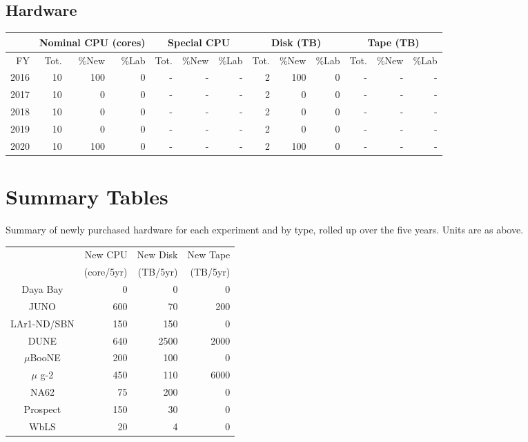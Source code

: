 \documentclass[pdftex,12pt,letter]{article}
\begin{document}
\subsection{Hardware}

\begin{tabular}[h]{|r || r|r|r || r|r|r || r|r|r || r|r|r ||}
  \hline
   & \multicolumn{3}{c||}{Nominal CPU (cores)} & \multicolumn{3}{c||}{Special CPU} & \multicolumn{3}{c||}{Disk (TB)} & \multicolumn{3}{c||}{Tape (TB)} \\
   \hline
  FY & Tot. & \%New & \%Lab & Tot. & \%New & \%Lab & Tot. & \%New & \%Lab & Tot. & \%New & \%Lab \\
  \hline
  2016 & 10 & 100& 0&- &- &- & 2& 100 & 0&- &- &- \\
  \hline
  2017 & 10&    0& 0&- &- &- & 2& 0& 0&- &- &-  \\
  \hline
  2018 & 10&    0& 0&- &- &- & 2& 0& 0&- &- &-  \\
  \hline
  2019 & 10&    0& 0&- &- &- & 2& 0& 0&- &- &-  \\
  \hline
  2020 & 10&  100& 0&- &- &- & 2& 100& 0&- &- &-  \\
  \hline
\end{tabular}

%

\pagebreak
\section{Summary Tables}

Summary of newly purchased hardware for each experiment and by type,
rolled up over the five years.
Units are as above.

\begin{center}
  
\begin{tabular}[h]{|c||r|r|r|}
\hline
    & New CPU    & New Disk & New Tape \\
    & (core/5yr) & (TB/5yr) & (TB/5yr) \\
\hline
Daya Bay & 0 & 0 & 0 \\
\hline
JUNO & 600 & 70 & 200 \\
\hline
LAr1-ND/SBN & 150 & 150 & 0 \\
\hline
DUNE & 640 & 2500 & 2000 \\
\hline
$\mu$BooNE & 200 & 100 & 0 \\
\hline
$\mu$ g-2 & 450 & 110 & 6000 \\
\hline
NA62 & 75 & 200 & 0 \\
\hline
Prospect & 150 & 30 & 0 \\
\hline
WbLS & 20 & 4 & 0 \\
\hline
\end{tabular}

\end{center}
\end{document}
